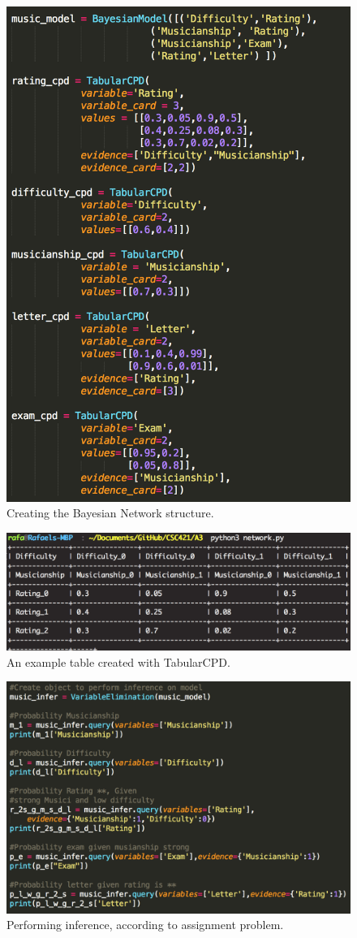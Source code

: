 \documentclass[12pt, letter]{article}
\begin{document}
 \begin{figure}[htb]
  \centering
  \includegraphics[width=0.75 \textwidth]{./figures/bayesian_create.png}
  \caption{Creating the Bayesian Network structure.}
\end{figure}

 \begin{figure}[htb]
  \centering
  \includegraphics[width=0.75 \textwidth]{./figures/table_example.png}
  \caption{An example table created with TabularCPD.}
\end{figure}

 \begin{figure}[htb]
  \centering
  \includegraphics[width=0.80 \textwidth]{./figures/inference_problem.png}
  \caption{Performing inference, according to assignment problem.}
\end{figure}
\end{document}
